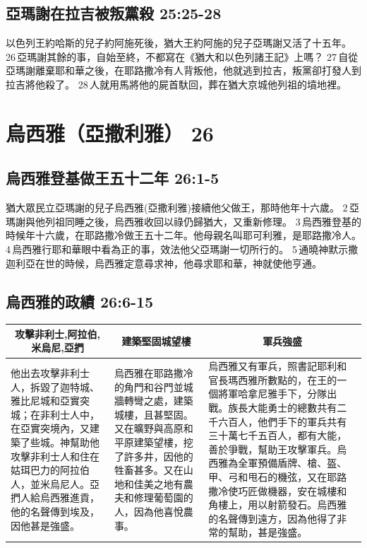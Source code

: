 \subsection{亞瑪謝在拉吉被叛黨殺 25:25-28}
以色列王約哈斯的兒子約阿施死後，猶大王約阿施的兒子亞瑪謝又活了十五年。 26 亞瑪謝其餘的事，自始至終，不都寫在《猶大和以色列諸王記》上嗎？ 27 自從亞瑪謝離棄耶和華之後，在耶路撒冷有人背叛他，他就逃到拉吉，叛黨卻打發人到拉吉將他殺了。 28 人就用馬將他的屍首馱回，葬在猶大京城他列祖的墳地裡。


\section{烏西雅（亞撒利雅） 26 }
\subsection{烏西雅登基做王五十二年 26:1-5}
猶大眾民立亞瑪謝的兒子烏西雅(亞撒利雅)接續他父做王，那時他年十六歲。 2 亞瑪謝與他列祖同睡之後，烏西雅收回以祿仍歸猶大，又重新修理。 3 烏西雅登基的時候年十六歲，在耶路撒冷做王五十二年。他母親名叫耶可利雅，是耶路撒冷人。 4 烏西雅行耶和華眼中看為正的事，效法他父亞瑪謝一切所行的。 5 通曉神默示撒迦利亞在世的時候，烏西雅定意尋求神，他尋求耶和華，神就使他亨通。

\subsection{烏西雅的政績 26:6-15}
\begin{table}[H]
\centering
\begin{tabular}{p{}|p{}|p{}}\hline\hline
\multicolumn{1}{c|}{攻擊非利士,阿拉伯,米烏尼,亞捫}&\multicolumn{1}{c|}{建築堅固城望樓}&\multicolumn{1}{c}{軍兵強盛}\\\hline
他出去攻擊非利士人，拆毀了迦特城、雅比尼城和亞實突城；在非利士人中，在亞實突境內，又建築了些城。神幫助他攻擊非利士人和住在姑珥巴力的阿拉伯人，並米烏尼人。亞捫人給烏西雅進貢，他的名聲傳到埃及，因他甚是強盛。
&烏西雅在耶路撒冷的角門和谷門並城牆轉彎之處，建築城樓，且甚堅固。又在曠野與高原和平原建築望樓，挖了許多井，因他的牲畜甚多。又在山地和佳美之地有農夫和修理葡萄園的人，因為他喜悅農事。
&烏西雅又有軍兵，照書記耶利和官長瑪西雅所數點的，在王的一個將軍哈拿尼雅手下，分隊出戰。族長大能勇士的總數共有二千六百人，他們手下的軍兵共有三十萬七千五百人，都有大能，善於爭戰，幫助王攻擊軍兵。烏西雅為全軍預備盾牌、槍、盔、甲、弓和甩石的機弦，又在耶路撒冷使巧匠做機器，安在城樓和角樓上，用以射箭發石。烏西雅的名聲傳到遠方，因為他得了非常的幫助，甚是強盛。\\\hline 
\end{tabular}
\end{table} 

